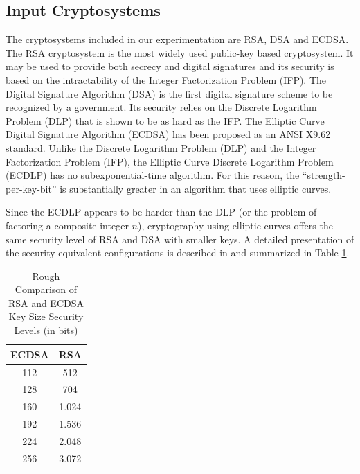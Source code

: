 \documentclass[authoryear]{elsarticle}
\begin{document}
\subsection{Input Cryptosystems}
The cryptosystems included in our experimentation are RSA, DSA and ECDSA. The RSA cryptosystem is the most widely used public-key based cryptosystem. It may be used to provide both secrecy and digital signatures and its security is based on the intractability of the Integer Factorization Problem (IFP). The Digital Signature Algorithm (DSA) is the first digital signature scheme to be recognized by a government. Its security relies on the Discrete Logarithm Problem (DLP) that is shown to be as hard as the IFP. The Elliptic Curve Digital Signature Algorithm (ECDSA) has been proposed as an ANSI X9.62 standard. Unlike the Discrete Logarithm Problem (DLP) and the Integer Factorization Problem (IFP), the Elliptic Curve Discrete Logarithm Problem (ECDLP) has no subexponential-time algorithm. For this reason, the ``strength-per-key-bit'' is substantially greater in an algorithm that uses elliptic curves.

Since the ECDLP appears to be harder than the DLP (or the problem of factoring a composite integer $n$), cryptography using elliptic curves offers the same security level of RSA and DSA with smaller keys. A detailed presentation of the security-equivalent configurations is described in \citet{sec2} and summarized in Table \ref{table:secLevels}.

\begin{table}[ht]
\caption{Rough Comparison of RSA and ECDSA Key Size Security Levels
  (in bits)}
\centering %
\begin{tabular}{|c|c|} %
\hline\hline %
ECDSA & RSA \\ [0.5ex] %
\hline\hline %
112 & 512  \\ %
128 & 704  \\
160 & 1.024 \\
192 & 1.536 \\
224 & 2.048 \\
256 & 3.072 \\ [1ex] %
\hline %
\end{tabular}
\label{table:secLevels} %
\end{table}
\end{document}
